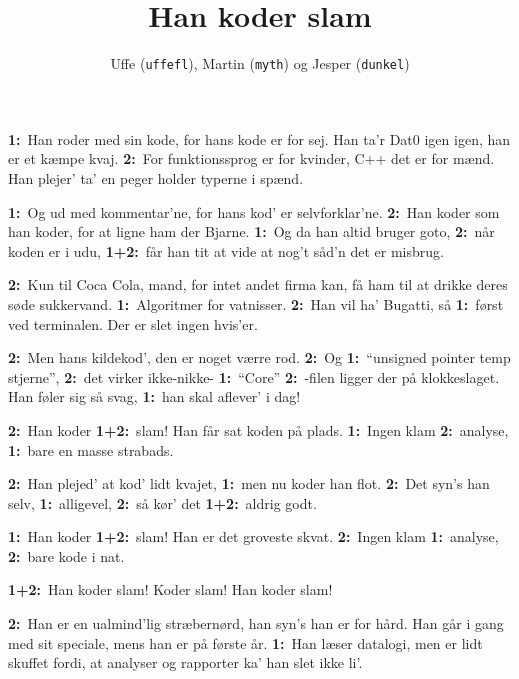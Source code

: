 \documentclass[danish]{article}
\title{Han koder slam}
\author{Uffe (\texttt{uffefl}), Martin (\texttt{myth}) og Jesper (\texttt{dunkel})}
\newcommand{\et}{\textbf{1:}~}
\renewcommand{\to}{\textbf{2:}~}
\newcommand{\etto}{\textbf{1+2:}~}
\begin{document}
\begin{song}

 \et{}Han roder med sin kode,
for hans kode er for sej.
Han ta'r Dat0 igen igen, 
han er et kæmpe kvaj.
\to{}For funktionssprog er for kvinder, 
C++ det er for mænd.
Han plejer' ta' en peger
holder typerne i spænd.

\et{}Og ud med kommentar'ne,
for hans kod' er selvforklar'ne.
\to{}Han koder som han koder,
for at ligne ham der Bjarne.
\et{}Og da han altid bruger goto,
\to{}når koden er i udu,
\etto{}får han tit at vide 
at nog't såd'n det er misbrug.

\to{}Kun til Coca Cola, mand,
for intet andet firma kan,
få ham til at drikke deres
søde sukkervand.
\et{}Algoritmer for vatnisser.
\to{}Han vil ha' Bugatti, så
\et{}først ved terminalen. 
Der er slet ingen hvis'er.

\to{}Men hans kildekod',
den er noget værre rod.
\to{}Og \et{}``unsigned pointer temp stjerne'',
\to{}det virker ikke-nikke-
\et{}``Core'' \to{}-filen ligger der på klokkeslaget.
Han føler sig så svag,
\et{}han skal aflever' i dag!

\newpage

 \to{}Han koder \etto{}slam!
Han får sat koden på plads.
\et{}Ingen klam \to{}analyse,
\et{}bare en masse strabads.

\to{}Han plejed' at kod' lidt kvajet,
\et{}men nu koder han flot.
\to{}Det syn's han selv, \et{}alligevel,
\to{}så kør' det \etto{}aldrig godt.

\et{}Han koder \etto{}slam!
Han er det groveste skvat.
\to{}Ingen klam \et{}analyse,
\to{}bare kode i nat.

\etto{}Han koder slam!
Koder slam!
Han koder slam!

\newpage

 \to{}Han er en ualmind'lig stræbernørd,
han syn's han er for hård.
Han går i gang med sit speciale,
mens han er på første år.
\et{}Han læser datalogi,
men er lidt skuffet fordi,
at analyser og rapporter 
ka' han slet ikke li'.


\end{song}
\end{document}
